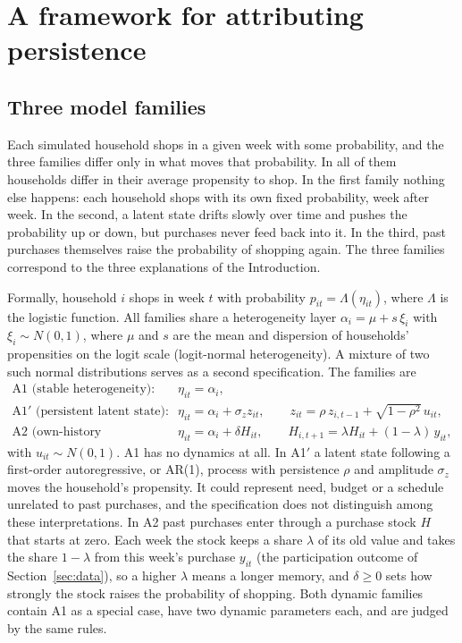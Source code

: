 \documentclass[11pt]{article}
\begin{document}
\section{A framework for attributing persistence}
\label{sec:framework}

\subsection{Three model families}

Each simulated household shops in a given week with some probability, and the three
families differ only in what moves that probability. In all of them households differ in
their average propensity to shop. In the first family nothing else happens: each household
shops with its own fixed probability, week after week. In the second, a latent state drifts
slowly over time and pushes the probability up or down, but purchases never feed back into
it. In the third, past purchases themselves raise the probability of shopping again. The
three families correspond to the three explanations of the Introduction.

Formally, household $i$ shops in week $t$ with probability $p_{it}=\Lambda(\eta_{it})$,
where $\Lambda$ is the logistic function. All families share a heterogeneity layer
$\alpha_i=\mu+s\,\xi_i$ with $\xi_i\sim N(0,1)$, where $\mu$ and $s$ are the mean and dispersion
of households' propensities on the logit scale (logit-normal heterogeneity). A mixture of two such normal distributions
serves as a second specification. The families are
\begin{align}
\text{A1 (stable heterogeneity):}\quad & \eta_{it}=\alpha_i, \label{eq:a1}\\
\text{A1$'$ (persistent latent state):}\quad & \eta_{it}=\alpha_i+\sigma_z z_{it},\qquad
  z_{it}=\rho\, z_{i,t-1}+\sqrt{1-\rho^2}\,u_{it}, \label{eq:a1p}\\
\text{A2 (own-history dependence):}\quad & \eta_{it}=\alpha_i+\delta H_{it},\qquad
  H_{i,t+1}=\lambda H_{it}+(1-\lambda)\,y_{it}, \label{eq:a2}
\end{align}
with $u_{it}\sim N(0,1)$. A1 has no dynamics at all. In A1$'$ a latent state following a
first-order autoregressive, or AR(1), process with persistence $\rho$ and amplitude $\sigma_z$
moves the household's propensity. It could represent need, budget or
a schedule unrelated to past purchases, and the specification does not distinguish among
these interpretations.
In A2 past purchases enter through a purchase stock $H$ that starts at zero. Each week the
stock keeps a share $\lambda$ of its old value and takes the share $1-\lambda$ from this week's
purchase $y_{it}$ (the participation outcome of Section~\ref{sec:data}), so a higher $\lambda$ means a longer memory, and $\delta\ge 0$ sets how strongly the
stock raises the probability of shopping. Both dynamic families contain A1 as a special case, have
two dynamic parameters each, and are judged by the same rules.
\end{document}
